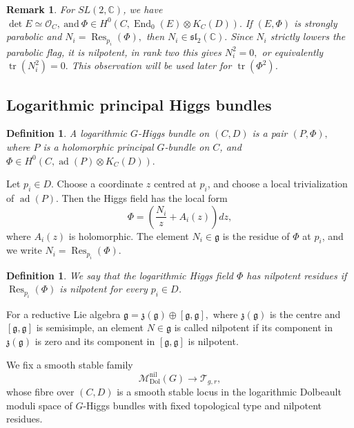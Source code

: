 \documentclass[10pt,a4paper]{amsart}
\numberwithin{equation}{section}
\newtheorem{definition}[theorem]{Definition}
\newtheorem{remark}[theorem]{Remark}
\begin{document}
\begin{remark}
For \(SL(2,\mathbb C)\), we have
\(
        \det E\simeq\mathcal O_C,
        \ \text{and} \
        \Phi\in H^0(C,\operatorname{End}_0(E)\otimes K_C(D)).
\)
If \((E,\Phi)\) is strongly parabolic and
\(
        N_i=\operatorname{Res}_{p_i}(\Phi),
\)
then
\(
        N_i\in\mathfrak{sl}_2(\mathbb C).
\)
Since \(N_i\) strictly lowers the parabolic flag, it is nilpotent, in rank
two this gives
\(
        N_i^2=0,
\)
or equivalently
\(
        \operatorname{tr}(N_i^2)=0.
\)
This observation will be used later for
\(\operatorname{tr}(\Phi^2)\).
\end{remark}


\subsection{Logarithmic principal Higgs bundles}

\begin{definition}
A \textit{logarithmic \(G\)-Higgs bundle} on \((C,D)\) is a pair
\(
        (P,\Phi),
\)
where \(P\) is a holomorphic principal \(G\)-bundle on \(C\), and
\(
        \Phi\in H^0(C,\operatorname{ad}(P)\otimes K_C(D)).
\)
\end{definition}

Let \(p_i\in D\). Choose a coordinate \(z\) centred at \(p_i\), and choose a
local trivialization of \(\operatorname{ad}(P)\). Then the Higgs field has the
local form
\[
        \Phi=
        \left(
        \frac{N_i}{z}+A_i(z)
        \right)dz,
\]
where \(A_i(z)\) is holomorphic. The element
\(
        N_i\in\mathfrak g
\)
is the residue of \(\Phi\) at \(p_i\), and we write
\(
        N_i=\operatorname{Res}_{p_i}(\Phi).
\)

\begin{definition}
We say that the logarithmic Higgs field \(\Phi\) has nilpotent residues if
\(
        \operatorname{Res}_{p_i}(\Phi)
\)
is nilpotent for every \(p_i\in D\).
\end{definition}

For a reductive Lie algebra
\(
        \mathfrak g
        =
        \mathfrak z(\mathfrak g)\oplus[\mathfrak g,\mathfrak g],
\)
where \(\mathfrak z(\mathfrak g)\) is the centre and
\([\mathfrak g,\mathfrak g]\) is semisimple, an element
\(
        N\in\mathfrak g
\)
is called nilpotent if its component in \(\mathfrak z(\mathfrak g)\) is zero
and its component in \([\mathfrak g,\mathfrak g]\) is nilpotent.

We fix a smooth stable family
\[
        \mathcal M^{\mathrm{nil}}_{\mathrm{Dol}}(G)
        \longrightarrow
        \mathcal T_{g,r},
\]
whose fibre over \((C,D)\) is a smooth stable locus in the logarithmic Dolbeault
moduli space of \(G\)-Higgs bundles with fixed topological type and nilpotent
residues.
\end{document}
